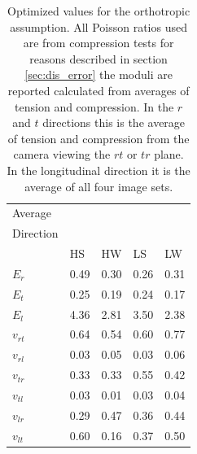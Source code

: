 \documentclass[10pt]{article}
\begin{document}
\begin{table}
\caption[Averaged orthotropic material constants]{Optimized values for the orthotropic assumption. All Poisson ratios used are from compression tests for reasons described in section \ref{sec:dis_error} the moduli are reported calculated from averages of tension and compression. In the \(r\) and \(t\) directions this is the average of tension and compression from the camera viewing the \(rt\) or \(tr\) plane. In the longitudinal direction it is the average of all four image sets.}
\label{table:optermised vals average}
\begin{tabular}{lllll}
\hline
Average	&	    &	    &	    &   \\
Direction&  	&	    &	    &   \\
	    &HS	    &HW	    &LS	    &LW \\
\(E_r\)	    &0.49	&0.30	&0.26	&0.31\\
\(E_t\)	    &0.25	&0.19	&0.24	&0.17\\
\(E_l\)	    &4.36	&2.81	&3.50	&2.38\\
\(v_{rt}\)	&0.64	&0.54	&0.60	&0.77\\
\(v_{rl}\)	&0.03	&0.05	&0.03	&0.06\\
\(v_{tr}\)	&0.33	&0.33	&0.55	&0.42\\
\(v_{tl}\)	&0.03	&0.01	&0.03	&0.04\\
\(v_{lr}\)	&0.29	&0.47	&0.36	&0.44\\
\(v_{lt}\)	&0.60	&0.16	&0.37	&0.50\\

\hline
\end{tabular}
\end{table}
\end{document}
